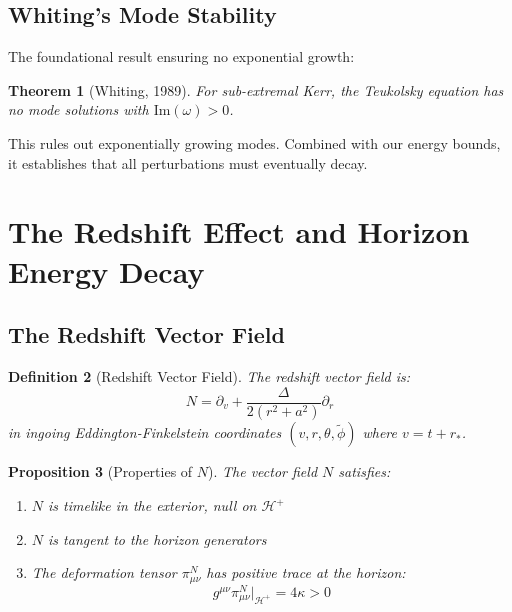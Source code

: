 \documentclass[12pt,a4paper]{article}
\newtheorem{theorem}{Theorem}[section]
\newtheorem{proposition}[theorem]{Proposition}
\newtheorem{definition}[theorem]{Definition}
\begin{document}
\subsection{Whiting's Mode Stability}

The foundational result ensuring no exponential growth:

\begin{theorem}[Whiting, 1989]
For sub-extremal Kerr, the Teukolsky equation has no mode solutions with $\text{Im}(\omega) > 0$.
\end{theorem}

This rules out exponentially growing modes. Combined with our energy bounds, it establishes that all perturbations must eventually decay.

\section{The Redshift Effect and Horizon Energy Decay}

\subsection{The Redshift Vector Field}

\begin{definition}[Redshift Vector Field]
The redshift vector field is:
\begin{equation}
N = \partial_v + \frac{\Delta}{2(r^2+a^2)}\partial_r
\end{equation}
in ingoing Eddington-Finkelstein coordinates $(v, r, \theta, \tilde{\phi})$ where $v = t + r_*$.
\end{definition}

\begin{proposition}[Properties of $N$]
The vector field $N$ satisfies:
\begin{enumerate}[label=(\roman*)]
    \item $N$ is timelike in the exterior, null on $\mathcal{H}^+$
    \item $N$ is tangent to the horizon generators
    \item The deformation tensor $\pi^N_{\mu\nu}$ has positive trace at the horizon:
    \begin{equation}
    g^{\mu\nu}\pi^N_{\mu\nu}|_{\mathcal{H}^+} = 4\kappa > 0
    \end{equation}
\end{enumerate}
\end{proposition}
\end{document}
